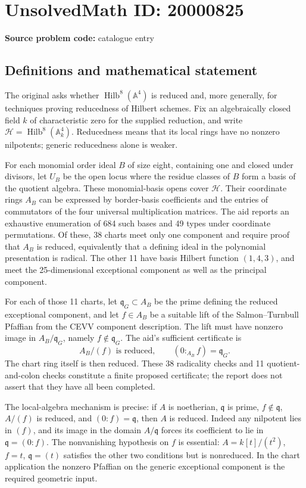 \documentclass[11pt]{article}
\newcommand{\A}{\mathbb{A}}
\begin{document}
\section*{UnsolvedMath ID: 20000825}
\textbf{Source problem code:} catalogue entry
\subsection{Definitions and mathematical statement}
The original asks whether \(\operatorname{Hilb}^8(\A^4)\) is reduced and, more generally, for techniques proving reducedness of Hilbert schemes. Fix an algebraically closed field \(k\) of characteristic zero for the supplied reduction, and write \(\mathcal H=\operatorname{Hilb}^8(\A_k^4)\). Reducedness means that its local rings have no nonzero nilpotents; generic reducedness alone is weaker.

For each monomial order ideal \(B\) of size eight, containing one and closed under divisors, let \(U_B\) be the open locus where the residue classes of \(B\) form a basis of the quotient algebra. These monomial-basis opens cover \(\mathcal H\). Their coordinate rings \(A_B\) can be expressed by border-basis coefficients and the entries of commutators of the four universal multiplication matrices. The aid reports an exhaustive enumeration of 684 such bases and 49 types under coordinate permutations. Of these, 38 charts meet only one component and require proof that \(A_B\) is reduced, equivalently that a defining ideal in the polynomial presentation is radical. The other 11 have basis Hilbert function \((1,4,3)\), and meet the 25-dimensional exceptional component as well as the principal component.

For each of those 11 charts, let \(\mathfrak q_G\subset A_B\) be the prime defining the reduced exceptional component, and let \(f\in A_B\) be a suitable lift of the Salmon--Turnbull Pfaffian from the CEVV component description. The lift must have nonzero image in \(A_B/\mathfrak q_G\), namely \(f\notin\mathfrak q_G\). The aid's sufficient certificate is
\[
 A_B/(f)\text{ is reduced},\qquad
 (0:_{A_B}f)=\mathfrak q_G.
\]
The chart ring itself is then reduced. These 38 radicality checks and 11 quotient-and-colon checks constitute a finite proposed certificate; the report does not assert that they have all been completed.

The local-algebra mechanism is precise: if \(A\) is noetherian, \(\mathfrak q\) is prime, \(f\notin\mathfrak q\), \(A/(f)\) is reduced, and \((0:f)=\mathfrak q\), then \(A\) is reduced. Indeed any nilpotent lies in \((f)\), and its image in the domain \(A/\mathfrak q\) forces its coefficient to lie in \(\mathfrak q=(0:f)\). The nonvanishing hypothesis on \(f\) is essential: \(A=k[t]/(t^2)\), \(f=t\), \(\mathfrak q=(t)\) satisfies the other two conditions but is nonreduced. In the chart application the nonzero Pfaffian on the generic exceptional component is the required geometric input.
\end{document}
